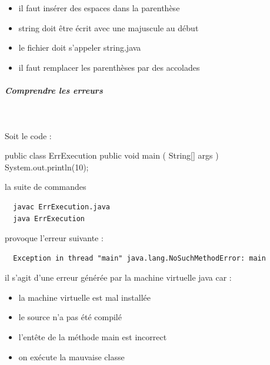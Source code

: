 \documentclass[11pt,a4paper]{article}
\begin{document}
            \par
        
            \begin{itemize} 
        
            \item[ \ding{"6D} ] il faut ins\'erer des espaces dans la parenth\`ese
        
            \item[ \ding{"6D} ] string doit \^etre \'ecrit avec une majuscule au d\'ebut
        
            \item[ \ding{"6D} ] le fichier doit s'appeler string.java
        
            \item[ \ding{"6D} ] il faut remplacer les parenth\`eses par des accolades
        
            \end{itemize} 
        
			
		\subparagraph{Comprendre les erreurs} 
		
                \textcolor{white}{.} \par
            
								Soit le code :
							
            \par
        \begin{Java}
  public class ErrExecution {
      public void main ( String[] args ) {
          System.out.println(10);
      }
  }							\end{Java}
								la suite de commandes 
							
            \par
        \begin{verbatim}
  javac ErrExecution.java 
  java ErrExecution			\end{verbatim}
								provoque l'erreur suivante :
							
            \par
        \begin{verbatim}
  Exception in thread "main" java.lang.NoSuchMethodError: main\end{verbatim}
								il s'agit d'une erreur g\'en\'er\'ee par la machine virtuelle java car :
							
            \par
        
            \begin{itemize} 
        
            \item[ \ding{"6D} ] la machine virtuelle est mal install\'ee
        
            \item[ \ding{"6D} ] le source n'a pas \'et\'e compil\'e
        
            \item[ \ding{"6D} ] l'ent\^ete de la m\'ethode main est incorrect
        
            \item[ \ding{"6D} ] on ex\'ecute la mauvaise classe
        
            \end{itemize} 
        
\end{document}
